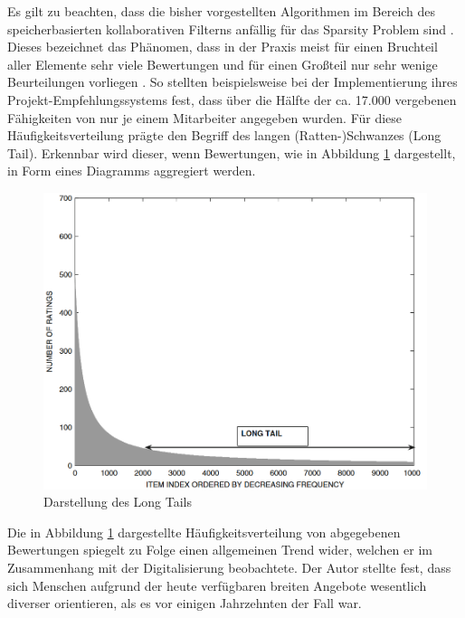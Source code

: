 Es gilt zu beachten, dass die bisher vorgestellten Algorithmen im Bereich des speicherbasierten kollaborativen Filterns anfällig für das Sparsity Problem sind \cite[S. 3f.]{grvcar:2006}. Dieses bezeichnet das Phänomen, dass in der Praxis meist für einen Bruchteil aller Elemente sehr viele Bewertungen und für einen Großteil nur sehr wenige Beurteilungen vorliegen \cite[S. 8]{recommenderSystems:2016}. So stellten beispielsweise \textcite[S. 3]{mitre:2014} bei der Implementierung ihres Projekt-Empfehlungssystems fest, dass über die Hälfte der ca. 17.000 vergebenen Fähigkeiten von nur je einem Mitarbeiter angegeben wurden.
Für diese Häufigkeitsverteilung prägte \textcite[S. 12]{anderson:2007} den Begriff des langen (Ratten-)Schwanzes (Long Tail). Erkennbar wird dieser, wenn Bewertungen, wie in Abbildung \ref{fig:empfehlungssysteme:cf:speicherbasiert:abb1} dargestellt, in Form eines Diagramms aggregiert werden.

\begin{figure}[h]
	\centering
	\includegraphics[width=1\textwidth]{gfx/long-tail.png}
	\caption{Darstellung des Long Tails \cite[S. 33]{recommenderSystems:2016}}
	\label{fig:empfehlungssysteme:cf:speicherbasiert:abb1}
\end{figure}

Die in Abbildung \ref{fig:empfehlungssysteme:cf:speicherbasiert:abb1} dargestellte Häufigkeitsverteilung von abgegebenen Bewertungen spiegelt \textcite[S. 1ff.]{anderson:2007} zu Folge einen allgemeinen Trend wider, welchen er im Zusammenhang mit der Digitalisierung beobachtete. Der Autor stellte fest, dass sich Menschen aufgrund der heute verfügbaren breiten Angebote wesentlich diverser orientieren, als es vor einigen Jahrzehnten der Fall war.

